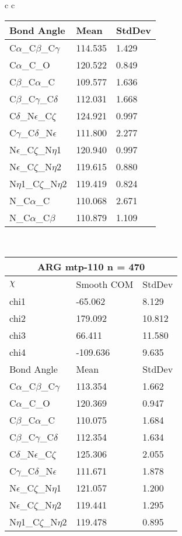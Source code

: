 \begin{longtable}{ c c }
\begin{tabular}{ l l l }
  Bond Angle   & Mean     & StdDev \\ \midrule
  C$\alpha$\_C$\beta$\_C$\gamma$ & 114.535 & 1.429\\
  C$\alpha$\_C\_O & 120.522 & 0.849\\
  C$\beta$\_C$\alpha$\_C & 109.577 & 1.636\\
  C$\beta$\_C$\gamma$\_C$\delta$ & 112.031 & 1.668\\
  C$\delta$\_N$\epsilon$\_C$\zeta$ & 124.921 & 0.997\\
  C$\gamma$\_C$\delta$\_N$\epsilon$ & 111.800 & 2.277\\
  N$\epsilon$\_C$\zeta$\_N$\eta$1 & 120.940 & 0.997\\
  N$\epsilon$\_C$\zeta$\_N$\eta$2 & 119.615 & 0.880\\
  N$\eta$1\_C$\zeta$\_N$\eta$2 & 119.419 & 0.824\\
  N\_C$\alpha$\_C & 110.068 & 2.671\\
  N\_C$\alpha$\_C$\beta$ & 110.879 & 1.109\\
  \bottomrule
  \end{tabular}
  \\
  \begin{tabular}{ l l l }
  \toprule
  \multicolumn{3}{c}{ARG \textbf{mtp-110} n = 470} \\ \toprule
  $\chi$       & Smooth COM & StdDev \\ \midrule
  chi1 & -65.062 & 8.129 \\ 
  chi2 & 179.092 & 10.812 \\ 
  chi3 & 66.411 & 11.580 \\ 
  chi4 & -109.636 & 9.635 \\ \midrule
  Bond Angle   & Mean     & StdDev \\ \midrule
  C$\alpha$\_C$\beta$\_C$\gamma$ & 113.354 & 1.662\\
  C$\alpha$\_C\_O & 120.369 & 0.947\\
  C$\beta$\_C$\alpha$\_C & 110.075 & 1.684\\
  C$\beta$\_C$\gamma$\_C$\delta$ & 112.354 & 1.634\\
  C$\delta$\_N$\epsilon$\_C$\zeta$ & 125.306 & 2.055\\
  C$\gamma$\_C$\delta$\_N$\epsilon$ & 111.671 & 1.878\\
  N$\epsilon$\_C$\zeta$\_N$\eta$1 & 121.057 & 1.200\\
  N$\epsilon$\_C$\zeta$\_N$\eta$2 & 119.441 & 1.295\\
  N$\eta$1\_C$\zeta$\_N$\eta$2 & 119.478 & 0.895\\

\end{tabular}
\end{longtable}
